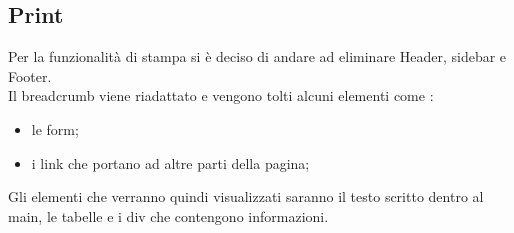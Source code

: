   \subsection{Print}
    Per la funzionalità di stampa si è deciso di andare ad eliminare Header, sidebar e Footer. \\
    Il breadcrumb viene riadattato e vengono tolti alcuni elementi come :
    \begin{itemize}
      \item le form;
      \item i link che portano ad altre parti della pagina;
    \end{itemize}
    Gli elementi che verranno quindi visualizzati saranno il testo scritto dentro al main, le tabelle e i div che contengono informazioni.